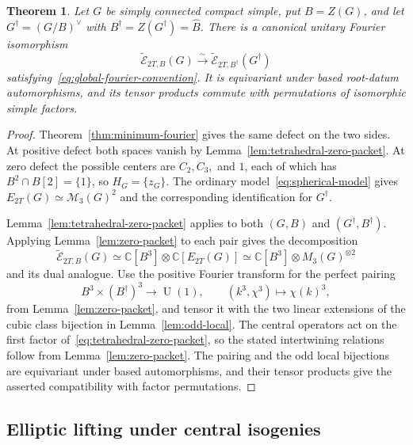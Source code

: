 \documentclass[11pt,a4paper,reqno]{amsart}
\theoremstyle{plain}
\newtheorem{theorem}{Theorem}[section]
\theoremstyle{definition}
\theoremstyle{remark}
\numberwithin{equation}{section}
\newcommand{\UU}{\operatorname{U}}
\newcommand{\CC}{\mathbb C}
\newcommand{\cM}{\mathcal M}
\newcommand{\wtE}{\widetilde{\mathcal E}}
\begin{document}
\begin{theorem}\label{thm:tetrahedral-fourier}
Let $G$ be simply connected compact simple, put $B=Z(G)$, and let $G^\dagger=(G/B)^\vee$ with $B^\dagger=Z(G^\dagger)=\widehat B$. There is a canonical unitary Fourier isomorphism
\[
\wtE_{2T,B}(G)\xrightarrow{\sim}\wtE_{2T,B^\dagger}(G^\dagger)
\]
satisfying~\eqref{eq:global-fourier-convention}. It is equivariant under based root-datum automorphisms, and its tensor products commute with permutations of isomorphic simple factors.
\end{theorem}
\begin{proof}
Theorem~\ref{thm:minimum-fourier} gives the same defect on the two sides. At positive defect both spaces vanish by Lemma~\ref{lem:tetrahedral-zero-packet}. At zero defect the possible centers are $C_2,C_3,$ and $1$, each of which has $B^2\cap B[2]=\{1\}$, so $H_G=\{z_G\}$. The ordinary model~\eqref{eq:spherical-model} gives $E_{2T}(G)\simeq\cM_3(G)^2$ and the corresponding identification for $G^\dagger$.

Lemma~\ref{lem:tetrahedral-zero-packet} applies to both $(G,B)$ and $(G^\dagger,B^\dagger)$. Applying Lemma~\ref{lem:zero-packet} to each pair gives the decomposition
\begin{equation}\label{eq:tetrahedral-zero-packet}
\wtE_{2T,B}(G)
\simeq\CC[B^3]\otimes\CC[E_{2T}(G)]
\simeq\CC[B^3]\otimes M_3(G)^{\otimes2}
\end{equation}
and its dual analogue. Use the positive Fourier transform for the perfect pairing
\[
B^3\times(B^\dagger)^3\longrightarrow\UU(1),
\qquad (k^3,\chi^3)\longmapsto\chi(k)^3,
\]
from Lemma~\ref{lem:zero-packet}, and tensor it with the two linear extensions of the cubic class bijection in Lemma~\ref{lem:odd-local}. The central operators act on the first factor of~\eqref{eq:tetrahedral-zero-packet}, so the stated intertwining relations follow from Lemma~\ref{lem:zero-packet}. The pairing and the odd local bijections are equivariant under based automorphisms, and their tensor products give the asserted compatibility with factor permutations.
\end{proof}

\subsection{Elliptic lifting under central isogenies}
\end{document}

